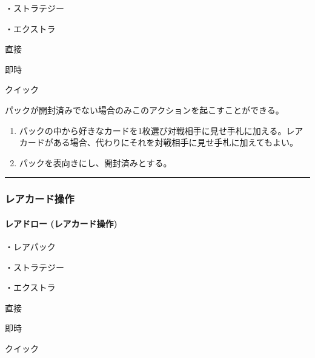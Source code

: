 \documentclass[letterpaper,10pt,dvipdfmx]{sphinxmanual}
\begin{document}
\sphinxAtStartPar
・ストラテジー

\sphinxAtStartPar
・エクストラ

\sphinxAtStartPar
{} 直接

\sphinxAtStartPar
{} 即時

\sphinxAtStartPar
{} クイック

\sphinxAtStartPar
{}

\sphinxAtStartPar
パックが開封済みでない場合のみこのアクションを起こすことができる。

\sphinxAtStartPar
{}
\begin{enumerate}
%
\item {} 
\sphinxAtStartPar
パックの中から好きなカードを1枚選び対戦相手に見せ手札に加える。レアカードがある場合、代わりにそれを対戦相手に見せ手札に加えてもよい。

\item {} 
\sphinxAtStartPar
パックを表向きにし、開封済みとする。

\end{enumerate}


\bigskip\hrule\bigskip



\subsubsection{レアカード操作}
\label{\detokenize{auto/frameActionlist:id5}}

\paragraph{レアドロー (レアカード操作)}
\label{\detokenize{auto/frameActionlist:act-raredraw}}\label{\detokenize{auto/frameActionlist:id6}}
\sphinxAtStartPar
{}

\sphinxAtStartPar
・レアパック

\sphinxAtStartPar
・ストラテジー

\sphinxAtStartPar
・エクストラ

\sphinxAtStartPar
{} 直接

\sphinxAtStartPar
{} 即時

\sphinxAtStartPar
{} クイック

\sphinxAtStartPar
{}
\end{document}
